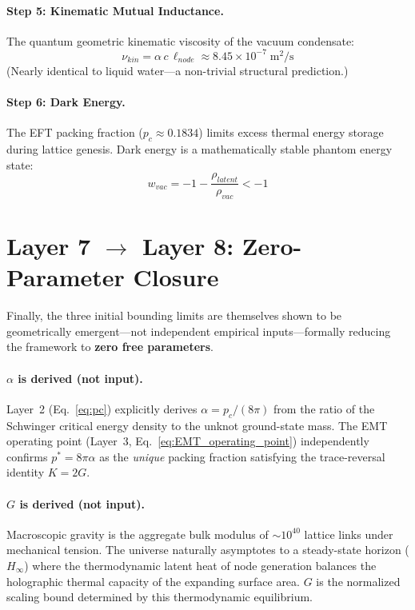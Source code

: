 \paragraph{Step 5: Kinematic Mutual Inductance.}
The quantum geometric kinematic viscosity of the vacuum condensate:
\begin{equation}
    \nu_{kin}
    = \alpha\,c\,\ell_{node}
    \approx 8.45 \times 10^{-7}\;\text{m}^2\text{/s}
    \label{eq:nu_kin}
\end{equation}
(Nearly identical to liquid water---a non-trivial structural prediction.)

\paragraph{Step 6: Dark Energy.}
The EFT packing fraction ($p_c \approx 0.1834$) limits excess thermal energy
storage during lattice genesis. Dark energy is a mathematically stable phantom
energy state:
\begin{equation}
    w_{vac} = -1 - \frac{\rho_{latent}}{\rho_{vac}} < -1
    \label{eq:dark_energy}
\end{equation}

\section{Layer 7 $\to$ Layer 8: Zero-Parameter Closure}
\label{sec:layer78}

Finally, the three initial bounding limits are themselves shown to be
geometrically emergent---not independent empirical inputs---formally reducing
the framework to \textbf{zero free parameters}.

\paragraph{$\alpha$ is derived (not input).}
Layer~2 (Eq.~\ref{eq:pc}) explicitly derives $\alpha = p_c / (8\pi)$ from the
ratio of the Schwinger critical energy density to the unknot ground-state mass.
The EMT operating point (Layer~3, Eq.~\ref{eq:EMT_operating_point})
independently confirms $p^* = 8\pi\alpha$ as the \textit{unique} packing
fraction satisfying the trace-reversal identity $K = 2G$.

\paragraph{$G$ is derived (not input).}
Macroscopic gravity is the aggregate bulk modulus of $\sim\!10^{40}$ lattice
links under mechanical tension. The universe naturally asymptotes to a
steady-state horizon ($H_\infty$) where the thermodynamic latent heat of node
generation balances the holographic thermal capacity of the expanding
surface area. $G$ is the normalized scaling bound determined by this
thermodynamic equilibrium.

